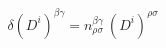 \begin{equation}
\delta(D^i)^{\beta\gamma}= n_{\rho \sigma}^{\beta\gamma}~(D^i)^{\rho\sigma}   \label{eq:uc}
\end{equation}


